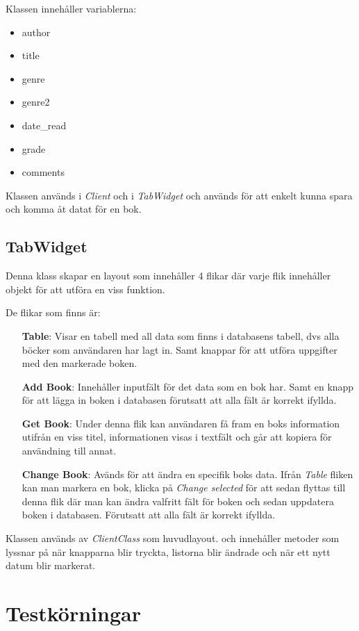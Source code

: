 \documentclass[11pt, titlepage, oneside, a4paper]{article}
\newcommand{\Subsection}[1]{\vspace{-4pt}\subsection{#1}\vspace{-8pt}}
\begin{document}
        Klassen innehåller variablerna:
        \begin{itemize}
		\item author
        \item title
        \item genre
        \item genre2
        \item date\_read
        \item grade
        \item comments
		\end{itemize}
        
        Klassen används i \emph{Client} och i \emph{TabWidget} och används för att enkelt kunna spara och komma åt datat för en bok.
        
        \Subsection{TabWidget}
        Denna klass skapar en layout som innehåller 4 flikar där varje flik innehåller objekt för att utföra en viss funktion. 
        
        De flikar som finns är:
        \begin{itemize}
		\item[\textbf{Table}:] Visar en tabell med all data som finns i databasens tabell, dvs alla böcker som användaren har lagt in. Samt knappar för att utföra uppgifter med den markerade boken.
        \item[\textbf{Add Book}:] Innehåller inputfält för det data som en bok har. Samt en knapp för att lägga in boken i databasen förutsatt att alla fält är korrekt ifyllda.
        \item[\textbf{Get Book}:] Under denna flik kan användaren få fram en boks information 
        utifrån en viss titel, informationen visas i textfält och går att kopiera för användning till annat.
        \item[\textbf{Change Book}:] Avänds för att ändra en specifik boks data. Ifrån \emph{Table} fliken kan man markera en bok, klicka på \emph{Change selected} för att sedan flyttas till denna flik där man kan ändra valfritt fält för boken och sedan uppdatera boken i databasen. Förutsatt att alla fält är korrekt ifyllda.
        
		\end{itemize}
       	
        Klassen används av \emph{ClientClass} som huvudlayout. och innehåller metoder som lyssnar på när knapparna blir tryckta, listorna blir ändrade och när ett nytt datum blir markerat. 
                
                
        \section{Testkörningar}
\end{document}
